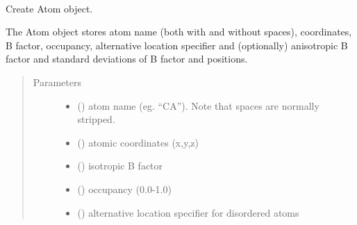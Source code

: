 \documentclass[a4paper,10pt,english]{sphinxmanual}
\begin{document}
\begin{fulllineitems}
\label{\detokenize{reference/generated/paramagpy.protein.CustomAtom:paramagpy.protein.CustomAtom}}~

\begin{fulllineitems}
\label{\detokenize{reference/generated/paramagpy.protein.CustomAtom:paramagpy.protein.CustomAtom.__init__}}
Create Atom object.

The Atom object stores atom name (both with and without spaces),
coordinates, B factor, occupancy, alternative location specifier
and (optionally) anisotropic B factor and standard deviations of
B factor and positions.
\begin{quote}\begin{description}
\item[{Parameters}] \leavevmode\begin{itemize}
\item {} 
 () \textendash{} atom name (eg. “CA”). Note that spaces are normally stripped.

\item {} 
 (\sphinxstyleliteralemphasis{\sphinxupquote{ (}}\sphinxstyleliteralemphasis{\sphinxupquote{, }}\sphinxstyleliteralemphasis{\sphinxupquote{)}}) \textendash{} atomic coordinates (x,y,z)

\item {} 
 () \textendash{} isotropic B factor

\item {} 
 () \textendash{} occupancy (0.0-1.0)

\item {} 
 () \textendash{} alternative location specifier for disordered atoms


\end{itemize}
\end{description}
\end{quote}
\end{fulllineitems}
\end{fulllineitems}
\end{document}
